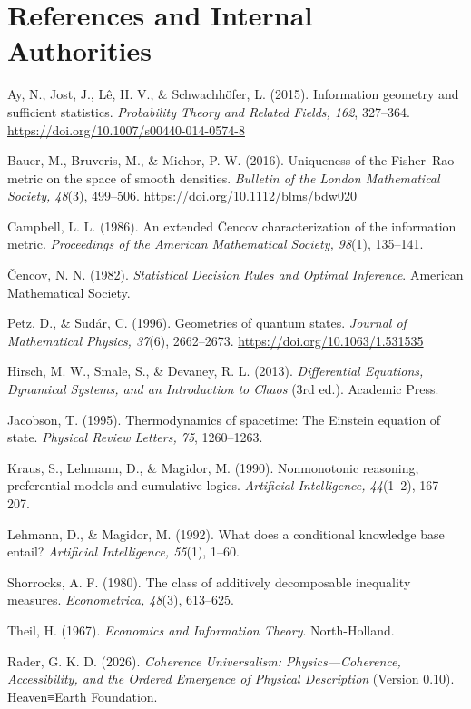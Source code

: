 \documentclass[
  11pt,
]{article}
\begin{document}
\section{References and Internal
Authorities}\label{references-and-internal-authorities}

Ay, N., Jost, J., Lê, H. V., \& Schwachhöfer, L. (2015). Information
geometry and sufficient statistics. \emph{Probability Theory and Related
Fields, 162}, 327--364. \url{https://doi.org/10.1007/s00440-014-0574-8}

Bauer, M., Bruveris, M., \& Michor, P. W. (2016). Uniqueness of the
Fisher--Rao metric on the space of smooth densities. \emph{Bulletin of
the London Mathematical Society, 48}(3), 499--506.
\url{https://doi.org/10.1112/blms/bdw020}

Campbell, L. L. (1986). An extended Čencov characterization of the
information metric. \emph{Proceedings of the American Mathematical
Society, 98}(1), 135--141.

Čencov, N. N. (1982). \emph{Statistical Decision Rules and Optimal
Inference}. American Mathematical Society.

Petz, D., \& Sudár, C. (1996). Geometries of quantum states.
\emph{Journal of Mathematical Physics, 37}(6), 2662--2673.
\url{https://doi.org/10.1063/1.531535}

Hirsch, M. W., Smale, S., \& Devaney, R. L. (2013). \emph{Differential
Equations, Dynamical Systems, and an Introduction to Chaos} (3rd ed.).
Academic Press.

Jacobson, T. (1995). Thermodynamics of spacetime: The Einstein equation
of state. \emph{Physical Review Letters, 75}, 1260--1263.

Kraus, S., Lehmann, D., \& Magidor, M. (1990). Nonmonotonic reasoning,
preferential models and cumulative logics. \emph{Artificial
Intelligence, 44}(1--2), 167--207.

Lehmann, D., \& Magidor, M. (1992). What does a conditional knowledge
base entail? \emph{Artificial Intelligence, 55}(1), 1--60.

Shorrocks, A. F. (1980). The class of additively decomposable inequality
measures. \emph{Econometrica, 48}(3), 613--625.

Theil, H. (1967). \emph{Economics and Information Theory}.
North-Holland.

Rader, G. K. D. (2026). \emph{Coherence Universalism:
Physics---Coherence, Accessibility, and the Ordered Emergence of
Physical Description} (Version 0.10). Heaven≡Earth Foundation.
\end{document}
